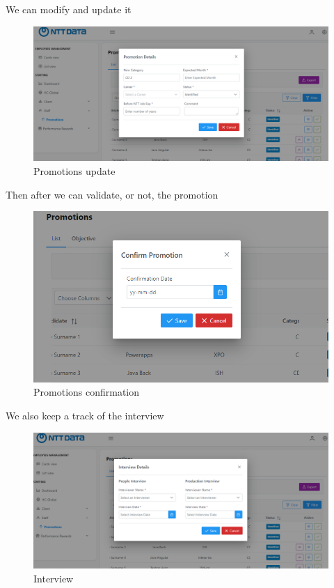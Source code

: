 \documentclass[12pt,a4paper,table,english]{article}
\begin{document}
	We can modify and update it
	\begin{figure}[H]
		\centering
		\includegraphics[width=150mm]{Image/promotiondetails}
		\caption{Promotions update}
		\label{fig:Promotions update}
	\end{figure}

	Then after we can validate, or not, the promotion

	\begin{figure}[H]
		\centering
		\includegraphics[width=150mm]{Image/promotionconfirm}
		\caption{Promotions confirmation}
		\label{fig:Promotions confirmation}
	\end{figure}

	We also keep a track of the interview
	\begin{figure}[H]
		\centering
		\includegraphics[width=150mm]{Image/promotioninterview}
		\caption{Interview}
		\label{fig:Interview}
	\end{figure}
\end{document}
